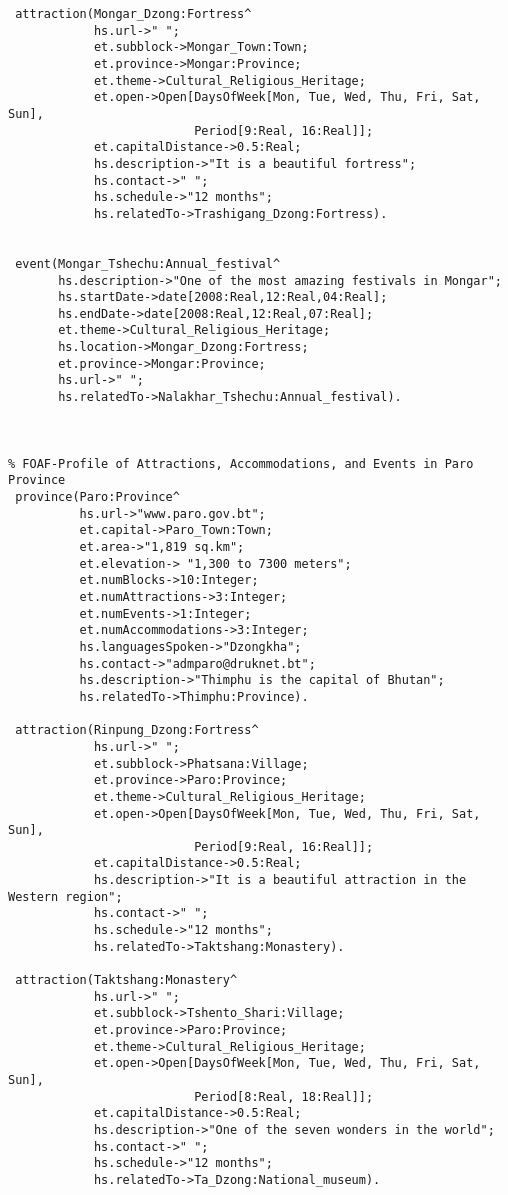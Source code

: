 \begin{verbatim}
 attraction(Mongar_Dzong:Fortress^
            hs.url->" ";
            et.subblock->Mongar_Town:Town;
            et.province->Mongar:Province;
            et.theme->Cultural_Religious_Heritage;
            et.open->Open[DaysOfWeek[Mon, Tue, Wed, Thu, Fri, Sat, Sun],
                          Period[9:Real, 16:Real]];
            et.capitalDistance->0.5:Real;
            hs.description->"It is a beautiful fortress";
            hs.contact->" ";
            hs.schedule->"12 months";
            hs.relatedTo->Trashigang_Dzong:Fortress).


 event(Mongar_Tshechu:Annual_festival^
       hs.description->"One of the most amazing festivals in Mongar";
       hs.startDate->date[2008:Real,12:Real,04:Real];
       hs.endDate->date[2008:Real,12:Real,07:Real];
       et.theme->Cultural_Religious_Heritage;
       hs.location->Mongar_Dzong:Fortress;
       et.province->Mongar:Province;
       hs.url->" ";
       hs.relatedTo->Nalakhar_Tshechu:Annual_festival).
             


% FOAF-Profile of Attractions, Accommodations, and Events in Paro Province 
 province(Paro:Province^
          hs.url->"www.paro.gov.bt";
          et.capital->Paro_Town:Town;
          et.area->"1,819 sq.km";
          et.elevation-> "1,300 to 7300 meters";
          et.numBlocks->10:Integer;
          et.numAttractions->3:Integer;
          et.numEvents->1:Integer;
          et.numAccommodations->3:Integer;
          hs.languagesSpoken->"Dzongkha";
          hs.contact->"admparo@druknet.bt";
          hs.description->"Thimphu is the capital of Bhutan";
          hs.relatedTo->Thimphu:Province).

 attraction(Rinpung_Dzong:Fortress^
            hs.url->" ";
            et.subblock->Phatsana:Village;
            et.province->Paro:Province;
            et.theme->Cultural_Religious_Heritage;
            et.open->Open[DaysOfWeek[Mon, Tue, Wed, Thu, Fri, Sat, Sun],
                          Period[9:Real, 16:Real]];
            et.capitalDistance->0.5:Real;
            hs.description->"It is a beautiful attraction in the Western region";
            hs.contact->" ";
            hs.schedule->"12 months";
            hs.relatedTo->Taktshang:Monastery).

 attraction(Taktshang:Monastery^
            hs.url->" ";
            et.subblock->Tshento_Shari:Village;
            et.province->Paro:Province;
            et.theme->Cultural_Religious_Heritage;
            et.open->Open[DaysOfWeek[Mon, Tue, Wed, Thu, Fri, Sat, Sun],
                          Period[8:Real, 18:Real]];
            et.capitalDistance->0.5:Real;
            hs.description->"One of the seven wonders in the world";
            hs.contact->" ";
            hs.schedule->"12 months";
            hs.relatedTo->Ta_Dzong:National_museum).


\end{verbatim}
